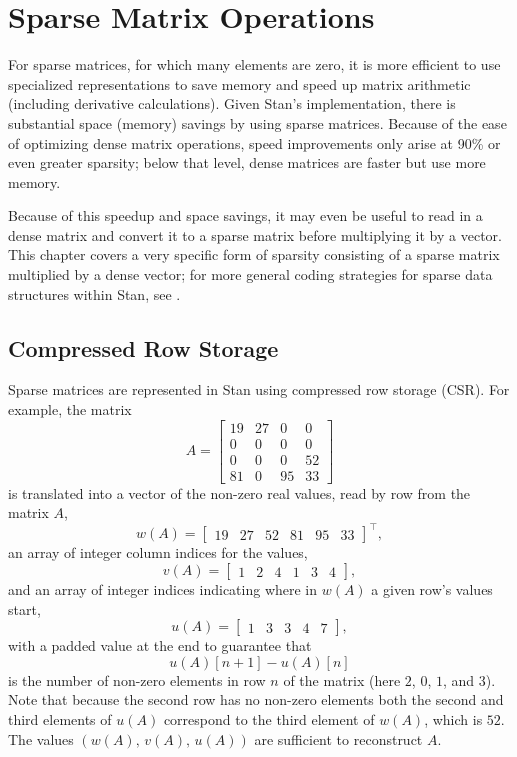 \chapter{Sparse Matrix Operations}\label{sparse-matrices.chapter}

\noindent
For sparse matrices, for which many elements are zero, it is more
efficient to use specialized representations to save memory and speed
up matrix arithmetic (including derivative calculations).  Given
Stan's implementation, there is substantial space (memory) savings by
using sparse matrices.  Because of the ease of optimizing dense matrix
operations, speed improvements only arise at 90\% or even greater
sparsity; below that level, dense matrices are faster but use more memory.  

Because of this speedup and space savings, it may even be useful to
read in a dense matrix and convert it to a sparse matrix before
multiplying it by a vector.  This chapter covers a very specific form
of sparsity consisting of a sparse matrix multiplied by a dense
vector; for more general coding strategies for sparse data structures
within Stan, see .

\section{Compressed Row Storage}\label{CSR.section}

Sparse matrices are represented in Stan using compressed row storage
(CSR).  For example, the matrix
\[
A = 
\begin{bmatrix}
19 & 27 & 0 & 0 
\\ 
0 & 0 & 0 & 0 
\\
0 & 0 & 0 & 52
\\
81 & 0 & 95 & 33
\end{bmatrix}
\]
is translated into a vector of the non-zero real values, read by row
from the matrix $A$,
\[
w(A) =
\begin{bmatrix}
19 & 27 & 52 & 81 & 95 & 33
\end{bmatrix}^{\top} \! \! \! ,
\]
an array of integer column indices for the values,
\[
v(A) = 
\begin{bmatrix}
1 & 2 & 4 & 1 & 3 & 4
\end{bmatrix} \! ,
\]
and an array of integer indices indicating where in $w(A)$ a given row's
values start,
\[
u(A) = 
\begin{bmatrix}
1 & 3 & 3 & 4 & 7
\end{bmatrix} \! ,
\]
with a padded value at the end to guarantee that 
\[
u(A)[n+1] - u(A)[n]
\]
is the number of non-zero elements in row $n$ of the matrix (here $2$, $0$,
$1$, and $3$). Note that because the second row has no non-zero elements both
the second and third elements of $u(A)$ correspond to the third element of
$w(A)$, which is $52$. The values $(w(A), \, v(A), \, u(A))$ are sufficient 
to reconstruct $A$.

